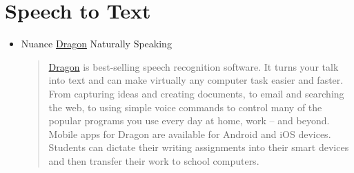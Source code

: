 \documentclass[letterpaper,10pt,english]{sphinxmanual}
\begin{document}
\section{Speech to Text}
\label{resources:id2}\label{resources:speech-to-text}\begin{itemize}
\item {} 
Nuance \href{http://www.nuance.com/dragon/index.htm}{Dragon} Naturally Speaking
\begin{quote}

\href{http://www.nuance.com/dragon/index.htm}{Dragon} is best-selling speech recognition software. It turns your talk into text and can make virtually any computer task easier and faster. From capturing ideas and creating documents, to email and searching the web, to using simple voice commands to control many of the popular programs you use every day at home, work – and beyond.
Mobile apps for Dragon are available for Android and iOS devices. Students can dictate their writing assignments into their smart devices and then transfer their work to school computers.
\end{quote}

\end{itemize}
\end{document}
